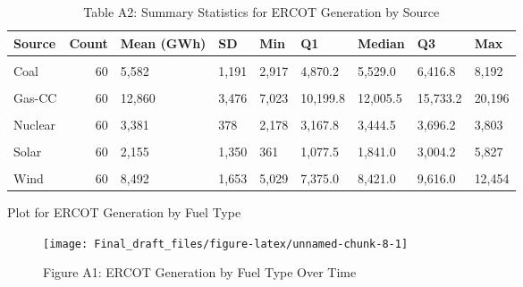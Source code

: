 \documentclass[
]{article}
\begin{document}
\begin{longtable}[t]{lrlllllll}
\caption{\label{tab:unnamed-chunk-7}Table A2: Summary Statistics for ERCOT Generation by Source}\\
\toprule
Source & Count & Mean (GWh) & SD & Min & Q1 & Median & Q3 & Max\\
\midrule
\cellcolor{gray!10}{Biomass} & \cellcolor{gray!10}{60} & \cellcolor{gray!10}{35} & \cellcolor{gray!10}{21} & \cellcolor{gray!10}{6} & \cellcolor{gray!10}{18.8} & \cellcolor{gray!10}{25.5} & \cellcolor{gray!10}{58.2} & \cellcolor{gray!10}{75}\\
Coal & 60 & 5,582 & 1,191 & 2,917 & 4,870.2 & 5,529.0 & 6,416.8 & 8,192\\
\cellcolor{gray!10}{Gas} & \cellcolor{gray!10}{60} & \cellcolor{gray!10}{2,573} & \cellcolor{gray!10}{1,416} & \cellcolor{gray!10}{673} & \cellcolor{gray!10}{1,394.5} & \cellcolor{gray!10}{2,320.0} & \cellcolor{gray!10}{3,487.0} & \cellcolor{gray!10}{7,195}\\
Gas-CC & 60 & 12,860 & 3,476 & 7,023 & 10,199.8 & 12,005.5 & 15,733.2 & 20,196\\
\cellcolor{gray!10}{Hydro} & \cellcolor{gray!10}{60} & \cellcolor{gray!10}{38} & \cellcolor{gray!10}{24} & \cellcolor{gray!10}{8} & \cellcolor{gray!10}{17.0} & \cellcolor{gray!10}{31.0} & \cellcolor{gray!10}{54.5} & \cellcolor{gray!10}{96}\\
\addlinespace
Nuclear & 60 & 3,381 & 378 & 2,178 & 3,167.8 & 3,444.5 & 3,696.2 & 3,803\\
\cellcolor{gray!10}{Other} & \cellcolor{gray!10}{60} & \cellcolor{gray!10}{63} & \cellcolor{gray!10}{79} & \cellcolor{gray!10}{-3} & \cellcolor{gray!10}{0.0} & \cellcolor{gray!10}{51.0} & \cellcolor{gray!10}{78.5} & \cellcolor{gray!10}{333}\\
Solar & 60 & 2,155 & 1,350 & 361 & 1,077.5 & 1,841.0 & 3,004.2 & 5,827\\
\cellcolor{gray!10}{WSL} & \cellcolor{gray!10}{36} & \cellcolor{gray!10}{-125} & \cellcolor{gray!10}{95} & \cellcolor{gray!10}{-407} & \cellcolor{gray!10}{-161.5} & \cellcolor{gray!10}{-83.0} & \cellcolor{gray!10}{-63.8} & \cellcolor{gray!10}{-33}\\
Wind & 60 & 8,492 & 1,653 & 5,029 & 7,375.0 & 8,421.0 & 9,616.0 & 12,454\\
\bottomrule
\end{longtable}

Plot for ERCOT Generation by Fuel Type

\begin{figure}

{\centering \texttt{[image: Final\_draft\_files/figure-latex/unnamed-chunk-8-1]} 

}

\caption{Figure A1: ERCOT Generation by Fuel Type Over Time}\label{fig:unnamed-chunk-8}
\end{figure}
\end{document}
